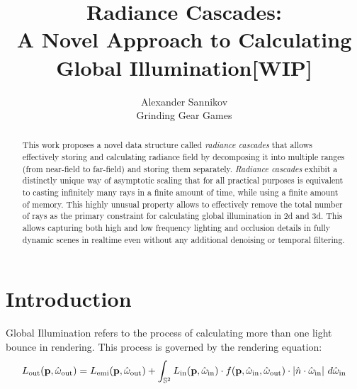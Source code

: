 \documentclass{jcgt}
\begin{document}
\title{Radiance Cascades:\\A Novel Approach to Calculating Global Illumination[WIP]}

\author
       {Alexander Sannikov\\Grinding Gear Games
       }


\maketitle
\thispagestyle{firstpagestyle}

\begin{abstract}
\small
This work proposes a novel data structure called \emph{radiance cascades} that allows effectively storing and calculating radiance field by decomposing it into multiple ranges (from near-field to far-field) and storing them separately. \emph{Radiance cascades} exhibit a distinctly unique way of asymptotic scaling that for all practical purposes is equivalent to casting infinitely many rays in a finite amount of time, while using a finite amount of memory. This highly unusual property allows to effectively remove the total number of rays as the primary constraint for calculating global illumination in 2d and 3d. This allows capturing both high and low frequency lighting and occlusion details in fully dynamic scenes in realtime even without any additional denoising or temporal filtering.
\end{abstract}


\section{Introduction}
\label{sec:introduction}
Global Illumination refers to the process of calculating more than one light bounce in rendering. This process is governed by the rendering equation:
\begin{equation}
  L_\mathrm{out}(\textbf{p}, \hat \omega_\mathrm{out}) = L_\mathrm{emi}(\textbf{p}, \hat \omega_\mathrm{out}) + \int_{\mathbb{S}^2} L_\mathrm{in}(\textbf{p}, \hat \omega_\mathrm{in}) \cdot f(\textbf p, \hat \omega_\mathrm{in}, \hat{\omega}_\mathrm{out}) \cdot |\hat{n} \cdot \hat{\omega}_\mathrm{in} |~ d\hat{\omega}_\mathrm{in}
  \label{eqn:rendering}
\end{equation}
  
\end{document}
